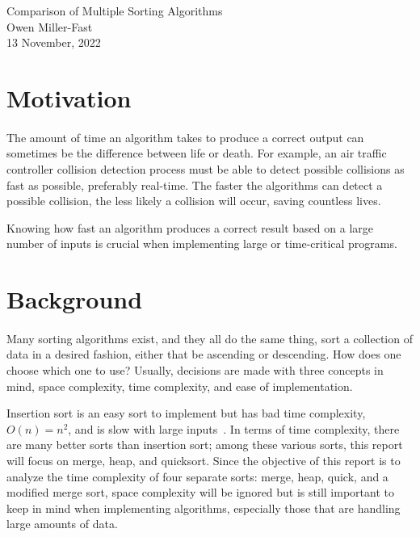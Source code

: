 \documentclass[onecolumn, letterpaper, 12pt]{article}
\begin{document}
\thispagestyle{empty} %

\newcommand\reporttitle{Comparison of Multiple Sorting Algorithms}
\newcommand\reportauthor{Owen Miller-Fast}
\newcommand\due{13 November, 2022}


\vfill
\begin{center}
	\hspace{0pt}
	\vfill
	\LARGE
	\reporttitle\\
	\reportauthor\\
	\due
	\normalfont
	\vfill
	\hspace{0pt}
	\pagebreak
\end{center}

\section{Motivation}
	\paragraph{}
	The amount of time an algorithm takes to produce a correct output can sometimes be the difference between life or death. For example, an air traffic controller collision detection process must be able to detect possible collisions as fast as possible, preferably real-time. The faster the algorithms can detect a possible collision, the less likely a collision will occur, saving countless lives.
	
	Knowing how fast an algorithm produces a correct result based on a large number of inputs is crucial when implementing large or time-critical programs.


\section{Background}
	\paragraph{}
	Many sorting algorithms exist, and they all do the same thing, sort a collection of data in a desired fashion, either that be ascending or descending. How does one choose which one to use? Usually, decisions are made with three concepts in mind, space complexity, time complexity, and ease of implementation.
	
	Insertion sort is an easy sort to implement but has bad time complexity, $O(n) = n^2$, and is slow with large inputs~\cite{cormen2001introduction}. In terms of time complexity, there are many better sorts than insertion sort; among these various sorts, this report will focus on merge, heap, and quicksort. Since the objective of this report is to analyze the time complexity of four separate sorts: merge, heap, quick, and a modified merge sort, space complexity will be ignored but is still important to keep in mind when implementing algorithms, especially those that are handling large amounts of data.
	
\end{document}
